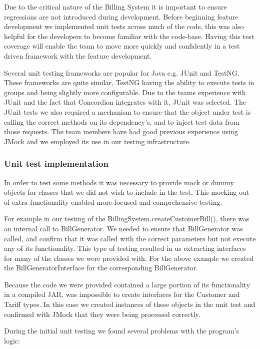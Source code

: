 \documentclass[pdftex,11pt,a4paper]{article}
\begin{document}
Due to the critical nature of the Billing System it is important to ensure regressions are not introduced during development. Before beginning feature development we implemented unit tests across much of the code, this was also helpful for the developers to become familiar with the code-base. Having this test coverage will enable the team to move more quickly and confidently in a test driven framework with the feature development.

Several unit testing frameworks are popular for Java e.g. JUnit and TestNG. These frameworks are quite similar, TestNG having the ability to execute tests in groups and being slightly more configurable. Due to the teams experience with JUnit and the fact that Concordion integrates with it, JUnit was selected. The JUnit tests we also required a mechanism to ensure that the object under test is calling the correct methods on its dependency's, and to inject test data from those requests. The team members have had good previous experience using JMock and we employed its use in our testing infrastructure.

\subsubsection{Unit test implementation}
In order to test some methods it was necessary to provide mock or dummy objects for classes that we did not wish to include in the test. This mocking out of extra functionality enabled more focused and comprehensive testing.

For example in our testing of the BillingSystem.createCustomerBill(), there was an internal call to BillGenerator. We needed to ensure that BillGenerator was called, and confirm that it was called with the correct parameters but not execute any of its functionality. This type of testing resulted in us extracting interfaces for many of the classes we were provided with. For the above example we created the BillGeneratorInterface for the corresponding BillGenerator.

Because the code we were provided contained a large portion of its functionality in a compiled JAR, was impossible to create interfaces for the Customer and Tariff types. In this case we created instances of these objects in the unit test and confirmed with JMock that they were being processed correctly.

During the initial unit testing we found several problems with the program’s logic:
\end{document}
